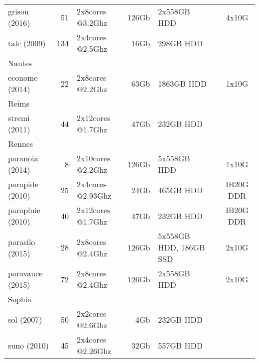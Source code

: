 \begin{tabular}{|l|r|l|r|p{4.9cm}|c|c|}
grisou (2016) & 51 & 2x8cores @3.2Ghz & 126Gb &  2x558GB HDD &  &  4x10G \\
talc (2009) & 134 & 2x4cores @2.5Ghz & 16Gb &  298GB HDD &  &  \\
Nantes &  &  &  &  &  &  \\
econome (2014) & 22 & 2x8cores @2.2Ghz & 63Gb &  1863GB HDD &  &  1x10G \\
Reims &  &  &  &  &  &  \\
stremi (2011) & 44 & 2x12cores @1.7Ghz & 47Gb &  232GB HDD &  &  \\
Rennes &  &  &  &  &  &  \\
paranoia (2014) & 8 & 2x10cores @2.2Ghz & 126Gb &  5x558GB HDD &  &  1x10G \\
parapide (2010) & 25 & 2x4cores @2.93Ghz & 24Gb &  465GB HDD &  & IB20G DDR \\
parapluie (2010) & 40 & 2x12cores @1.7Ghz & 47Gb &  232GB HDD &  & IB20G DDR \\
parasilo (2015) & 28 & 2x8cores @2.4Ghz & 126Gb &  5x558GB HDD, 186GB SSD &  &  2x10G \\
paravance (2015) & 72 & 2x8cores @2.4Ghz & 126Gb &  2x558GB HDD &  &  2x10G \\
Sophia &  &  &  &  &  &  \\
sol (2007) & 50 & 2x2cores @2.6Ghz & 4Gb &  232GB HDD &  &  \\
suno (2010) & 45 & 2x4cores @2.26Ghz & 32Gb &  557GB HDD &  &  \\


\hline 
\end{tabular} 